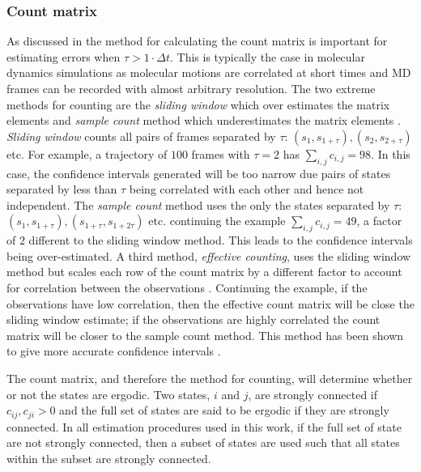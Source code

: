 \subsubsection{Count matrix}
As discussed in \cite{trendelkamp-schroerEstimationUncertaintyReversible2015b} the method for calculating the count matrix is important for estimating errors when  $\tau > 1\cdot \Delta t$. This is typically the case in molecular dynamics simulations as molecular motions are correlated at short times and MD frames can be recorded with almost arbitrary resolution.  The two extreme methods for counting are the \emph{sliding window} which over estimates the matrix elements and \emph{sample count} method which underestimates the matrix elements \cite{noeStatisticalInefficiencyMarkov}. \emph{Sliding window} counts all pairs of frames separated by $\tau$: $(s_1, s_{1+\tau}), (s_2, s_{2+\tau})$ etc. For example, a trajectory of $100$ frames with $\tau=2$ has $\sum_{i,j}c_{i,j}=98$. In this case, the confidence intervals generated will be too narrow due pairs of states separated by less than $\tau$ being correlated with each other and hence not independent. The \emph{sample count} method uses the only the states separated by $\tau$: $(s_1, s_{1+\tau}), (s_{1+\tau}, s_{1+2\tau})$ etc. continuing the example $\sum_{i,j}c_{i,j}=49$, a factor of $2$ different to the sliding window method. This leads to the confidence intervals being over-estimated. A third method, \emph{effective counting}, uses the sliding window method but scales each row of the count matrix by a different factor to account for correlation between the observations \cite{noeStatisticalInefficiencyMarkov}. Continuing the example, if the observations have low correlation, then the effective count matrix will be close the sliding window estimate; if the observations are highly correlated the count matrix will be closer to the sample count method. This method has been shown to give more accurate confidence intervals \cite{trendelkamp-schroerEstimationUncertaintyReversible2015b}. 

The count matrix, and therefore the method for counting,  will determine whether or not the states are ergodic. Two states, $i$ and $j$, are strongly connected if $c_{ij}, c_{ji}>0$ and the full set of states are said to be ergodic if they are strongly connected\cite{schererPyEMMASoftwarePackage2015a}. In all estimation procedures used in this work, if the full set of state are not strongly connected, then a subset of states are used such that all states within the subset are strongly connected.

